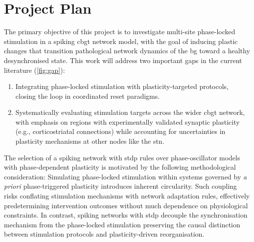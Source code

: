\section{Project Plan}
The primary objective of this project is to investigate multi-site phase-locked stimulation in a spiking \acrshort{cbgt} network
model, with the goal of inducing plastic changes that transition pathological network dynamics of the \acrshort{bg} toward
a healthy desynchronised state. This work will address two important gaps in the current literature (\cref{fig:gap}):
\begin{enumerate}[nosep]
	\item Integrating phase-locked stimulation with plasticity-targeted protocols, closing the loop in coordinated
	      reset paradigms.
	\item Systematically evaluating stimulation targets across the wider \acrshort{cbgt} network, with emphasis on regions with
	      experimentally validated synaptic plasticity (e.g., corticostriatal connections) while accounting for
	      uncertainties in plasticity mechanisms at other nodes like the \acrshort{stn}.
\end{enumerate}
The selection of a spiking network with \acrshort{stdp} rules over phase-oscillator models with phase-dependent plasticity is
motivated by the following methodological consideration:
Simulating phase-locked stimulation within systems governed by \textit{a priori} phase-triggered plasticity introduces
inherent circularity.
Such coupling risks conflating stimulation mechanisms with network adaptation rules, effectively predetermining
intervention outcomes without much dependence on physiological constraints.
In contrast, spiking networks with \acrshort{stdp} decouple the synchronisation mechanism from the phase-locked stimulation
preserving the causal distinction between stimulation protocols and plasticity-driven reorganisation.

